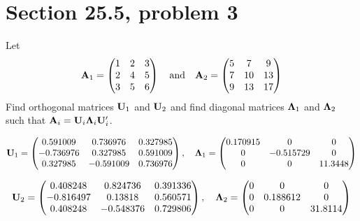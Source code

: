 \section{Section 25.5, problem 3}
Let
$${\bf A}_1=\left(\begin{matrix}
1 & 2 & 3\cr
2 & 4 & 5\cr
3 & 5 & 6
\end{matrix}\right)\quad\hbox{and}\quad{\bf A}_2=\left(\begin{matrix}
5 & 7 & 9\cr
7 & 10 & 13\cr
9 & 13 & 17
\end{matrix}\right)
$$
Find orthogonal matrices ${\bf U}_1$ and ${\bf U}_2$ and find
diagonal matrices ${\bf\Lambda}_1$ and ${\bf\Lambda}_2$ such that
${\bf A}_i={\bf U}_i{\bf\Lambda}_i{\bf U}_i'$.

\bigskip
\noindent
$${\bf U}_1=\left(\begin{matrix}
0.591009 & 0.736976 & 0.327985\cr
-0.736976 & 0.327985 & 0.591009\cr
0.327985 & -0.591009 & 0.736976
\end{matrix}\right),\quad
{\bf\Lambda}_1=\left(\begin{matrix}
0.170915 & 0 & 0\cr
0 & -0.515729 & 0\cr
0 & 0 & 11.3448
\end{matrix}\right)
$$

$$
{\bf U}_2=\left(\begin{matrix}
0.408248 & 0.824736 & 0.391336\cr
-0.816497 & 0.13818 & 0.560571\cr
0.408248 & -0.548376 & 0.729806
\end{matrix}\right),\quad
{\bf\Lambda}_2=\left(\begin{matrix}
0 & 0 & 0\cr
0 & 0.188612 & 0\cr
0 & 0 & 31.8114
\end{matrix}\right)
$$
